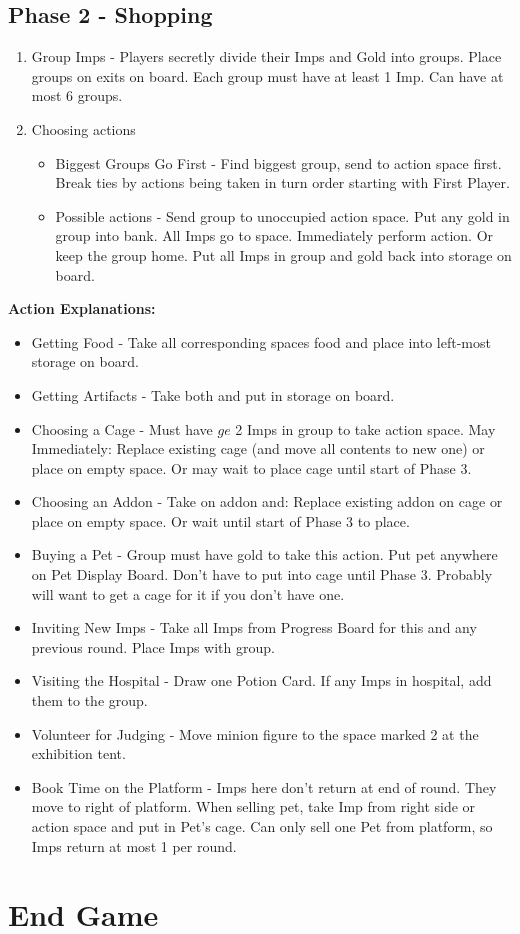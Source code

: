 \documentclass[12pt]{article}
\newenvironment{enumerateCustom}
{\begin{enumerate}
  \setlength{\itemsep}{1pt}
  \setlength{\parskip}{0pt}
  \setlength{\parsep}{0pt}}
{\end{enumerate}}
\newenvironment{itemizeCustom}
{\begin{itemize}
  \setlength{\itemsep}{1pt}
  \setlength{\parskip}{0pt}
  \setlength{\parsep}{0pt}}
{\end{itemize}}
\begin{document}
\begin{multicols*}{2}
\subsection*{Phase 2 - Shopping}
\begin{enumerateCustom}
	\item Group Imps - Players secretly divide their Imps and Gold into groups. Place groups on exits on board. Each group must have at least 1 Imp. Can have at most 6 groups.
	\item Choosing actions
		\begin{itemizeCustom}
			\item Biggest Groups Go First - Find biggest group, send to action space first. Break ties by actions being taken in turn order starting with First Player.
			\item Possible actions - Send group to unoccupied action space. Put any gold in group into bank. All Imps go to space. Immediately perform action. Or keep the group home. Put all Imps in group and gold back into storage on board.
		\end{itemizeCustom}
\end{enumerateCustom}

\textbf{Action Explanations:}
\begin{itemizeCustom}
	\item Getting Food - Take all corresponding spaces food and place into left-most storage on board.
	\item Getting Artifacts - Take both and put in storage on board.
	\item Choosing a Cage - Must have $ge$ 2 Imps in group to take action space. May Immediately: Replace existing cage (and move all contents to new one) or place on empty space. Or may wait to place cage until start of Phase 3.
	\item Choosing an Addon - Take on addon and: Replace existing addon on cage or place on empty space. Or wait until start of Phase 3 to place.
	\item Buying a Pet - Group must have gold to take this action. Put pet anywhere on Pet Display Board. Don't have to put into cage until Phase 3. Probably will want to get a cage for it if you don't have one.
	\item Inviting New Imps - Take all Imps from Progress Board for this and any previous round. Place Imps with group.
	\item Visiting the Hospital - Draw one Potion Card. If any Imps in hospital, add them to the group.
	\item Volunteer for Judging - Move minion figure to the space marked 2 at the exhibition tent.
	\item Book Time on the Platform - Imps here don't return at end of round. They move to right of platform. When selling pet, take Imp from right side or action space and put in Pet's cage. Can only sell one Pet from platform, so Imps return at most 1 per round.
\end{itemizeCustom}

\section*{End Game}

\end{multicols*}
\end{document}
